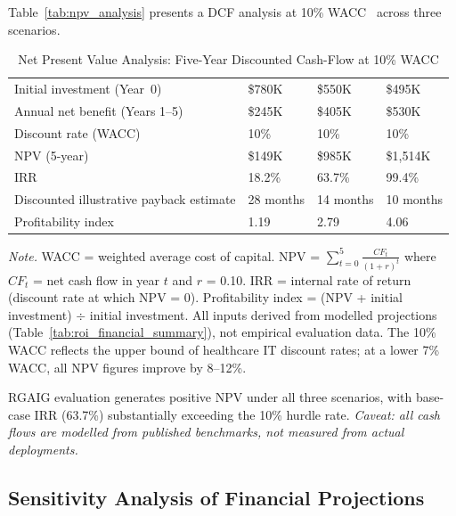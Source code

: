 Table~\ref{tab:npv_analysis} presents a DCF analysis at 10\% WACC~\cite{kumar2013healthcare} across three scenarios.

\begin{table}[H]
\tablestripes
\tablefontsize
\caption[Net Present Value Analysis]{Net Present Value Analysis: Five-Year Discounted Cash-Flow at 10\% WACC}
\begin{tabularx}{\textwidth}{@{} p{3cm} p{2.5cm} p{2.5cm} L @{}}
\toprule
{} &  &  &  \\
\midrule
Initial investment (Year~0) & \$780K & \$550K & \$495K \\
Annual net benefit (Years 1--5) & \$245K & \$405K & \$530K \\
Discount rate (WACC) & 10\% & 10\% & 10\% \\
NPV (5-year) & \$149K & \$985K & \$1,514K \\
IRR & 18.2\% & 63.7\% & 99.4\% \\
Discounted illustrative payback estimate & 28 months & 14 months & 10 months \\
Profitability index & 1.19 & 2.79 & 4.06 \\
\bottomrule
\end{tabularx}
\vspace{0.5em}\noindent\textit{Note.} WACC = weighted average cost of capital. NPV = $\sum_{t=0}^{5} \frac{CF_t}{(1 + r)^t}$ where $CF_t$ = net cash flow in year $t$ and $r$ = 0.10. IRR = internal rate of return (discount rate at which NPV = 0). Profitability index = (NPV + initial investment) $\div$ initial investment. All inputs derived from modelled projections (Table~\ref{tab:roi_financial_summary}), not empirical evaluation data. The 10\% WACC reflects the upper bound of healthcare IT discount rates; at a lower 7\% WACC, all NPV figures improve by 8--12\%.
\end{table}

\noindent RGAIG evaluation generates positive NPV under all three scenarios, with base-case IRR (63.7\%) substantially exceeding the 10\% hurdle rate. \textit{Caveat: all cash flows are modelled from published benchmarks, not measured from actual deployments.}

\subsection{Sensitivity Analysis of Financial Projections}

